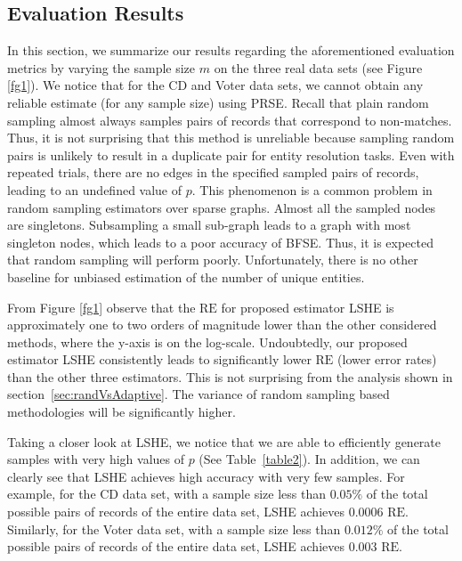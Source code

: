 \documentclass[aoas]{imsart}
\begin{document}
\subsection{Evaluation Results}
In this section, we summarize our results regarding the aforementioned evaluation metrics by varying the sample size $m$ on the three real data sets (see Figure \ref{fg1}). We notice that for the CD and Voter data sets, we cannot obtain any reliable estimate (for any sample size) using PRSE. Recall that plain random sampling almost always samples pairs of records that correspond to non-matches. Thus, it is not surprising that this method is unreliable because sampling random pairs is unlikely to result in a duplicate pair for entity resolution tasks. Even with repeated trials, there are no edges in the specified sampled pairs of records, leading to an undefined value of $p$. This phenomenon is a common problem in random sampling estimators over sparse graphs. Almost all the sampled nodes are singletons. Subsampling a small sub-graph leads to a graph with most singleton nodes, which leads to a poor accuracy of BFSE. Thus, it is expected that random sampling will perform poorly. Unfortunately, there is no other baseline for unbiased estimation of the number of unique entities.

From Figure \ref{fg1} observe that the $\text{RE}$ for proposed estimator LSHE is approximately one to two orders of magnitude lower than the other considered methods, where the  y-axis is on the log-scale. Undoubtedly, our proposed estimator LSHE consistently leads to significantly lower $\text{RE}$ (lower error rates) than the other three estimators. This is not surprising from the analysis shown in section~\ref{sec:randVsAdaptive}. The variance of random sampling based methodologies will be significantly higher.



Taking a closer look at LSHE, we notice that we are able to efficiently generate samples with very high values of $p$ (See Table~\ref{table2}).
In addition, we can clearly see that LSHE achieves high accuracy with very few samples. For example, for the CD data set, with a sample size less than $0.05\%$ of the total possible pairs of records of the entire data set, LSHE achieves $0.0006$ $\text{RE}$. Similarly, for the Voter data set, with a sample size less than $0.012\%$ of the total possible pairs of records of the entire data set, LSHE achieves $0.003$ $\text{RE}$.
\end{document}
